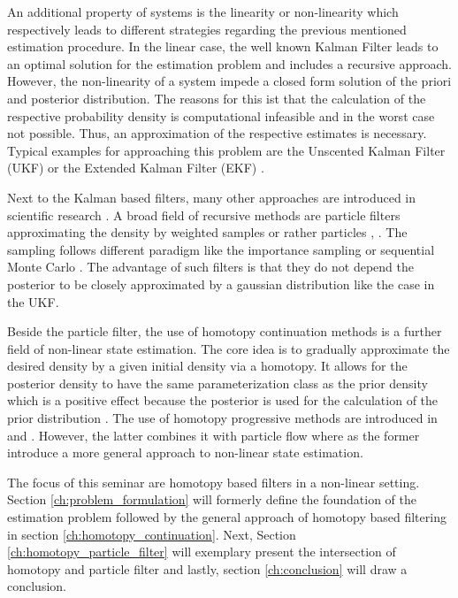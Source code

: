 \documentclass[a4paper]{IEEEtran}
\begin{document}
An additional property of systems is the linearity or non-linearity which respectively leads to different strategies regarding the previous mentioned estimation procedure.
In the linear case, the well known Kalman Filter \cite{Kalman1960} leads to an optimal solution for the estimation problem and includes a recursive approach. However, the non-linearity of a system
impede a closed form solution of the priori and posterior distribution. The reasons for this ist that the calculation of the respective probability density is computational infeasible and in the worst case not
possible. Thus, an approximation of the respective estimates is necessary. Typical examples for approaching this problem are the Unscented Kalman Filter (UKF) \cite{julier2004} or the Extended Kalman Filter (EKF) \cite{jazwinski2007}.

Next to the Kalman based filters, many other approaches are introduced in scientific research \cite{daum2005}. A broad field of recursive methods are particle filters approximating the density by weighted samples or rather particles \cite{arulampalam2002}, \cite{crisan2002}. 
The sampling follows different paradigm like the importance sampling or sequential Monte Carlo \cite{cappe2007b}. The advantage of such filters is that they do not depend the posterior to be closely approximated by a gaussian distribution \cite{cappe2007b} like the 
case in the UKF.

Beside the particle filter, the use of homotopy continuation methods is a further field of non-linear state estimation. The core idea is to gradually approximate the desired density by a given initial density via a homotopy. 
It allows for the posterior density to have the same parameterization class as the prior density which is a positive effect because the posterior is used for the calculation of the prior distribution \cite{hagmar2011}. 
The use of homotopy progressive methods are introduced in \cite{hanebeck2003} and \cite{daum2005}. However, the latter combines it with particle flow where as the former introduce a more general approach to non-linear state estimation.

The focus of this seminar are homotopy based filters in a non-linear setting. Section \ref{ch:problem_formulation} will formerly define the foundation of the estimation problem followed by the general approach of
homotopy based filtering in section \ref{ch:homotopy_continuation}. Next, Section \ref{ch:homotopy_particle_filter} will exemplary present the intersection of homotopy and particle filter and lastly, section \ref{ch:conclusion} will draw a conclusion.
\end{document}
